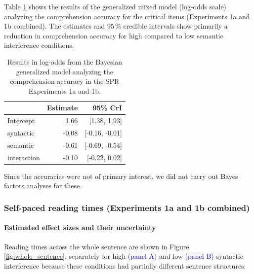 \documentclass[review,preprint,12pt,authoryear,floatsintext]{elsarticle}
\begin{document}
Table \ref{tab:spr_acc_mod} shows the results of the generalized mixed model (log-odds scale) analyzing the comprehension accuracy for the critical items (Experiments 1a and 1b combined). The estimates and 95\,\% credible intervals show primarily a reduction in comprehension accuracy for high compared to low semantic interference conditions.

\begin{table}[ht]
    \caption{Results in log-odds from the Bayesian generalized model analyzing the comprehension accuracy in the SPR Experiments 1a and 1b.}
    \label{tab:spr_acc_mod}
    \centering
    \begin{tabular}{lrr}
    \toprule
    & Estimate &  95\% CrI  \\
    \midrule
Intercept& 1.66 &   [1.38, 1.93]\\
syntactic& -0.08 &  [-0.16, -0.01]\\
semantic&  -0.61 & [-0.69, -0.54]\\
interaction& -0.10&  [-0.22, 0.02]\\
    \bottomrule
    \end{tabular}
\end{table}

Since the accuracies were not of primary interest, we did not carry out Bayes factors analyses for these.

\subsubsection*{Self-paced reading times (Experiments 1a and 1b combined)}

\paragraph{Estimated effect sizes and their uncertainty}

Reading times across the whole sentence are shown in Figure \ref{fig:whole_sentence}, separately for high \textcolor{blue}{(panel A)} and low \textcolor{blue}{(panel B)} syntactic interference because these conditions had partially different sentence structures. 
\end{document}
